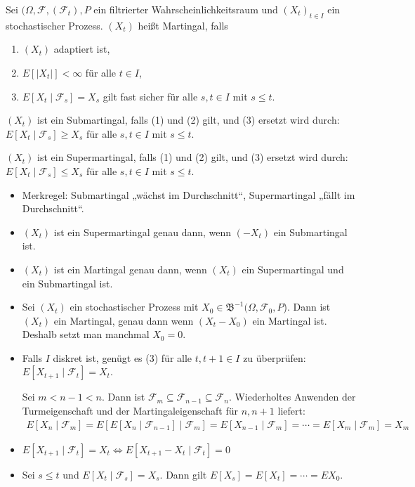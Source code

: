 \documentclass[a4paper,twoside,DIV15,BCOR12mm]{scrbook}
\newcommand{\cF}{\mathcal F}
\newcommand{\borel}{{\mathfrak B}}
\begin{document}
\begin{definition}
Sei $(\Omega, \cF, (\cF_t), P$ ein filtrierter Wahrscheinlichkeitsraum und $(X_t)_{t\in I}$ ein stochastischer Prozess. $(X_t)$ heißt Martingal, falls 
\begin{enumerate}
\item $(X_t)$ adaptiert ist,
\item $E[|X_t|] < \infty$ für alle $t\in I$,
\item $E[X_t\mid \cF_s] = X_s$ gilt fast sicher für alle $s,t\in I$ mit $s\le t$.
\end{enumerate}

$(X_t)$ ist ein Submartingal, falls (1) und (2) gilt, und (3) ersetzt wird durch: $E[X_t\mid \cF_s] \ge X_s$ für alle $s,t\in I$ mit $s\le t$.

$(X_t)$ ist ein Supermartingal, falls (1) und (2) gilt, und (3) ersetzt wird durch: $E[X_t\mid \cF_s] \le X_s$ für alle $s,t\in I$ mit $s\le t$.
\end{definition}

\begin{bemerkung}
\begin{itemize}
\item Merkregel: Su\rlap{\hspace{-1.1pt}\raisebox{5pt}{$\uparrow$}}bmartingal „wächst im Durchschnitt“, 
Su\rlap{\hspace{-1.1pt}\raisebox{-5pt}{$\downarrow$}}permartingal „fällt im Durchschnitt“. 
\item $(X_t)$ ist ein Supermartingal genau dann, wenn $(-X_t)$ ein Submartingal ist.
\item $(X_t)$ ist ein Martingal genau dann, wenn $(X_t)$ ein Supermartingal und ein Submartingal ist.
\item Sei $(X_t)$ ein stochastischer Prozess mit $X_0\in \borel^{-1}(\Omega, \cF_0, P$). Dann ist $(X_t)$ ein Martingal, genau dann wenn $(X_t-X_0)$ ein Martingal ist. Deshalb setzt man manchmal $X_0=0$.
\item Falls $I$ diskret ist, genügt es (3) für alle $t, t+1\in I$ zu überprüfen: $E[X_{t+1}\mid \cF_t] = X_t$.

\begin{beweis}
Sei $m< n-1 < n$. Dann ist $\cF_m \subseteq \cF_{n-1} \subseteq \cF_n$. Wiederholtes Anwenden der Turmeigenschaft und der Martingaleigenschaft für $n, n+1$ liefert:
\begin{align*}
E[X_n\mid\cF_m] = E[ E[X_n\mid \cF_{n-1}] \mid \cF_m] = E[ X_{n-1} \mid \cF_m] = \cdots = E[X_m \mid \cF_m] = X_m
\end{align*}
\end{beweis}
\item $E[X_{t+1} \mid \cF_t] = X_t \iff E[X_{t+1}-X_t \mid \cF_t] = 0$
\item Sei $s\le t$ und $E[X_t \mid \cF_s] = X_s$. Dann gilt $E[X_s] = E[X_t] = \cdots = EX_0$.
\end{itemize}
\end{bemerkung}
\end{document}
